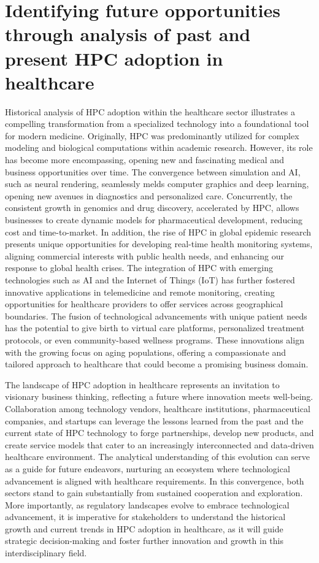 \section{Identifying future opportunities through analysis of past and present HPC adoption in healthcare}\label{se:2-4}

Historical analysis of HPC adoption within the healthcare sector illustrates a compelling transformation from a specialized technology  into a foundational tool for modern medicine. Originally, HPC was predominantly utilized for complex modeling and biological computations within academic research. However, its role has become more encompassing, opening new and fascinating medical and business opportunities over time. The convergence between simulation and AI, such as neural rendering, seamlessly melds computer graphics and deep learning, opening new avenues in diagnostics and personalized care. Concurrently, the consistent growth in genomics and drug discovery, accelerated by HPC, allows businesses to create dynamic models for pharmaceutical development, reducing cost and time-to-market. In addition, the rise of HPC in global epidemic research presents unique opportunities for developing real-time health monitoring systems, aligning commercial interests with public health needs, and enhancing our response to global health crises. The integration of HPC with emerging technologies such as AI and the Internet of Things (IoT) has further fostered innovative applications in telemedicine and remote monitoring, creating opportunities for healthcare providers to offer services across geographical boundaries. The fusion of technological advancements with unique patient needs has the potential to give birth to virtual care platforms, personalized treatment protocols, or even community-based wellness programs. These innovations align with the growing focus on aging populations, offering a compassionate and tailored approach to healthcare that could become a promising business domain.

The landscape of HPC adoption in healthcare represents an invitation to visionary business thinking, reflecting a future where innovation meets well-being. Collaboration among technology vendors, healthcare institutions, pharmaceutical companies, and startups can leverage the lessons learned from the past and the current state of HPC technology to forge partnerships, develop new products, and create service models that cater to an increasingly interconnected and data-driven healthcare environment. The analytical understanding of this evolution can serve as a guide for future endeavors, nurturing an ecosystem where technological advancement is aligned with healthcare requirements. In this convergence, both sectors stand to gain substantially from sustained cooperation and exploration. More importantly, as regulatory landscapes evolve to embrace technological advancement, it is imperative for stakeholders to understand the historical growth and current trends in HPC adoption in healthcare, as it will guide strategic decision-making and foster further innovation and growth in this interdisciplinary field. 

